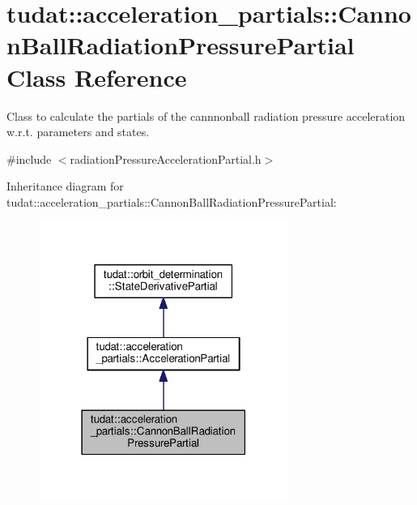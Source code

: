 \hypertarget{classtudat_1_1acceleration__partials_1_1CannonBallRadiationPressurePartial}{}\section{tudat\+:\+:acceleration\+\_\+partials\+:\+:Cannon\+Ball\+Radiation\+Pressure\+Partial Class Reference}
\label{classtudat_1_1acceleration__partials_1_1CannonBallRadiationPressurePartial}


Class to calculate the partials of the cannnonball radiation pressure acceleration w.\+r.\+t. parameters and states.  




{\ttfamily \#include $<$radiation\+Pressure\+Acceleration\+Partial.\+h$>$}



Inheritance diagram for tudat\+:\+:acceleration\+\_\+partials\+:\+:Cannon\+Ball\+Radiation\+Pressure\+Partial\+:
\nopagebreak
\begin{figure}[H]
\begin{center}
\leavevmode
\includegraphics[width=231pt]{classtudat_1_1acceleration__partials_1_1CannonBallRadiationPressurePartial__inherit__graph}
\end{center}
\end{figure}


